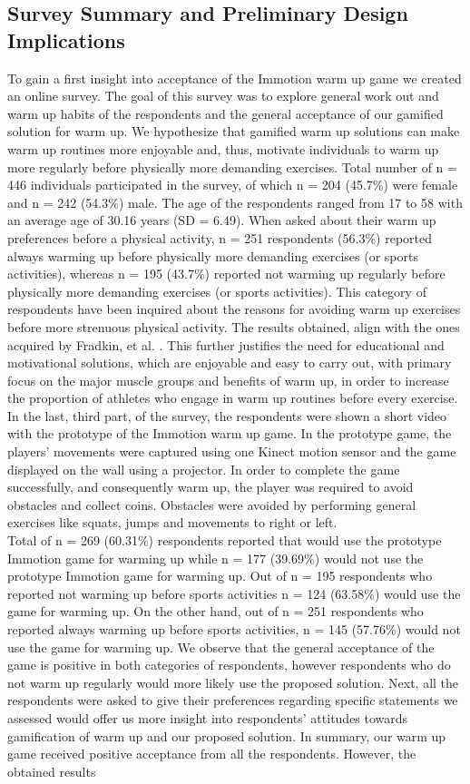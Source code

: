 \subsection{Survey Summary and Preliminary Design Implications}
To gain a first insight into acceptance of the Immotion warm up game we created an online survey. The goal of this survey was to explore general work out and warm up habits of the respondents and the general acceptance of our gamified solution for warm up. We hypothesize that gamified warm up solutions can make warm up routines more enjoyable and, thus, motivate individuals to warm up more regularly before physically more demanding exercises. Total number of n = 446 individuals participated in the survey, of which n = 204 (45.7\%) were female and n = 242 (54.3\%) male. The age of the respondents ranged from 17 to 58 with an average age of 30.16 years (SD = 6.49). When asked about their warm up preferences before a physical activity, n = 251 respondents (56.3\%) reported always warming up before physically more demanding exercises (or sports activities), whereas n = 195 (43.7\%) reported not warming up regularly before physically more demanding exercises (or sports activities). This category of respondents have been inquired about the reasons for avoiding warm up exercises before more strenuous physical activity. The results obtained, align with the ones acquired by Fradkin, et al. \cite{fradkin2010effects}. This further justifies the need for educational and motivational solutions, which are enjoyable and easy to carry out, with primary focus on the major muscle groups and benefits of warm up, in order to increase the proportion of athletes who engage in warm up routines before every exercise. In the last, third part, of the survey, the respondents were shown a short video with the prototype of the Immotion warm up game. In the prototype game, the players' movements were captured using one Kinect motion sensor and the game displayed on the wall using a projector. In order to complete the game successfully, and consequently warm up, the player was required to avoid obstacles and collect coins. Obstacles were avoided by performing general exercises like squats, jumps and movements to right or left. \\Total of n = 269 (60.31\%) respondents reported that would use the prototype Immotion game for warming up while n = 177 (39.69\%) would not use the prototype Immotion game for warming up. Out of n = 195 respondents who reported not warming up before sports activities n = 124 (63.58\%) would use the game for warming up. On the other hand, out of n = 251 respondents who reported always warming up before sports activities, n = 145 (57.76\%) would not use the game for warming up. We observe that the general acceptance of the game is positive in both categories of respondents, however respondents who do not warm up regularly would more likely use the proposed solution. Next, all the respondents were asked to give their preferences regarding specific statements we assessed would offer us more insight into respondents' attitudes towards gamification of warm up and our proposed solution. In summary, our warm up game received positive acceptance from all the respondents. However, the obtained results 